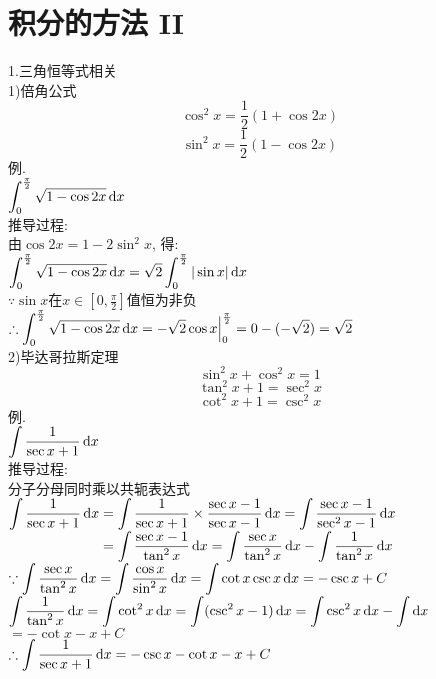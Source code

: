 \chapter{积分的方法 II}
1.三角恒等式相关\\
1)倍角公式\\
\[\cos^2x=\frac{1}{2}(1+\cos2x)\]
\[\sin^2x=\frac{1}{2}(1-\cos2x)\]
例.\\
\phantom{例}$\displaystyle\int_0^{\frac{\pi}{2}}\sqrt{1-\cos2x}\mathop{}\!\mathrm{d} x$\\
推导过程:\\
由$\cos2x=1-2\sin^2x$, 得:\\
$\displaystyle\int_0^{\frac{\pi}{2}}\sqrt{1-\cos2x}\mathop{}\!\mathrm{d} x=\sqrt{2}\int_0^{\frac{\pi}{2}}|\sin x|\mathop{}\!\mathrm{d} x$\\
$\because\sin x$在$x\in[0,\frac{\pi}{2}]$值恒为非负\\
$\therefore\displaystyle\int_0^{\frac{\pi}{2}}\sqrt{1-\cos2x}\mathop{}\!\mathrm{d} x=-\sqrt{2}\cos x\Big{|}_0^{\frac{\pi}{2}}=0-(-\sqrt{2})=\sqrt{2}$\\

2)毕达哥拉斯定理\\
\[\sin^2x+\cos^2x=1\]
\[\tan^2x+1=\sec^2x\]
\[\cot^2x+1=\csc^2x\]
例.\\
\phantom{例}$\displaystyle\int\frac{1}{\sec x+1}\mathop{}\!\mathrm{d} x$\\
推导过程:\\
分子分母同时乘以共轭表达式\\
$\displaystyle\int\frac{1}{\sec x+1}\mathop{}\!\mathrm{d} x=\int\frac{1}{\sec x+1}\times\frac{\sec x-1}{\sec x-1}\mathop{}\!\mathrm{d} x=\int\frac{\sec x-1}{\sec^2x-1}\mathop{}\!\mathrm{d} x$\\
$\displaystyle\phantom{\int\frac{1}{\sec x+1}\dif x}=\int\frac{\sec x-1}{\tan^2x}\dif x=\int\frac{\sec x}{\tan^2x}\dif x-\int\frac{1}{\tan^2x}\dif x$\\
$\displaystyle\because\int\frac{\sec x}{\tan^2x}\mathop{}\!\mathrm{d} x=\int\frac{\cos x}{\sin^2x}\mathop{}\!\mathrm{d} x=\int\cot x\csc x\mathop{}\!\mathrm{d} x=-\csc x+C$\\
\phantom{$\because$}$\displaystyle\int\frac{1}{\tan^2x}\mathop{}\!\mathrm{d} x=\int\cot^2x\mathop{}\!\mathrm{d} x=\int(\csc^2x-1)\mathop{}\!\mathrm{d} x=\int\csc^2x\mathop{}\!\mathrm{d} x-\int\mathop{}\!\mathrm{d} x$\\
$=-\cot x-x+C$\\
$\displaystyle\therefore\int\frac{1}{\sec x+1}\mathop{}\!\mathrm{d} x=-\csc x-\cot x-x+C$\\


